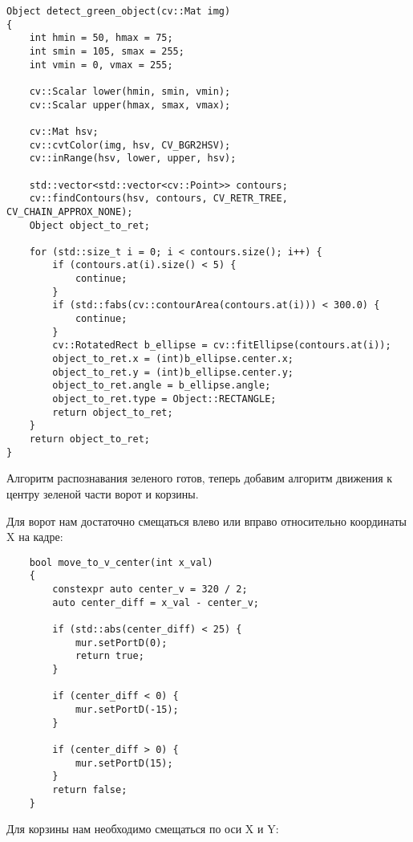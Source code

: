 \begin{verbatim}
Object detect_green_object(cv::Mat img)
{
    int hmin = 50, hmax = 75;
    int smin = 105, smax = 255;
    int vmin = 0, vmax = 255;

    cv::Scalar lower(hmin, smin, vmin);
    cv::Scalar upper(hmax, smax, vmax);

    cv::Mat hsv;
    cv::cvtColor(img, hsv, CV_BGR2HSV);
    cv::inRange(hsv, lower, upper, hsv);

    std::vector<std::vector<cv::Point>> contours;
    cv::findContours(hsv, contours, CV_RETR_TREE, CV_CHAIN_APPROX_NONE);
    Object object_to_ret;

    for (std::size_t i = 0; i < contours.size(); i++) {
        if (contours.at(i).size() < 5) {
            continue;
        }
        if (std::fabs(cv::contourArea(contours.at(i))) < 300.0) {
            continue;
        }
        cv::RotatedRect b_ellipse = cv::fitEllipse(contours.at(i));
        object_to_ret.x = (int)b_ellipse.center.x;
        object_to_ret.y = (int)b_ellipse.center.y;
        object_to_ret.angle = b_ellipse.angle;
        object_to_ret.type = Object::RECTANGLE;
        return object_to_ret;
    }
    return object_to_ret;
}
\end{verbatim}

Алгоритм распознавания зеленого готов, теперь добавим алгоритм движения к центру зеленой части ворот и корзины. 

Для ворот нам достаточно смещаться влево или вправо относительно координаты X на кадре:

\begin{verbatim}
    bool move_to_v_center(int x_val)
    {
        constexpr auto center_v = 320 / 2;
        auto center_diff = x_val - center_v;

        if (std::abs(center_diff) < 25) {
            mur.setPortD(0);
            return true;
        }

        if (center_diff < 0) {
            mur.setPortD(-15);
        }

        if (center_diff > 0) {
            mur.setPortD(15);
        }
        return false;
    }
\end{verbatim}

Для корзины нам необходимо смещаться по оси X и Y:

